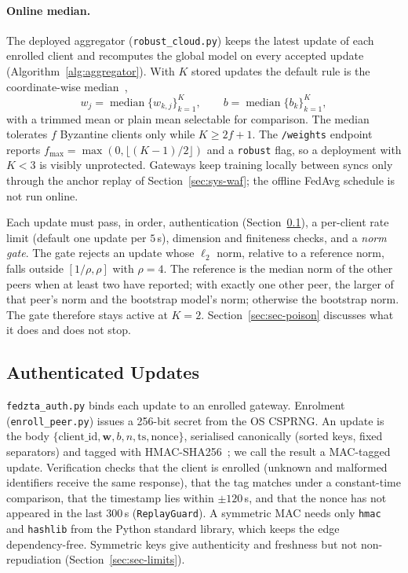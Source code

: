 \paragraph{Online median.}
The deployed aggregator (\texttt{robust\_cloud.py}) keeps the latest update of each enrolled client and recomputes the global model on every accepted update (Algorithm~\ref{alg:aggregator}). With $K$ stored updates the default rule is the coordinate-wise median~\cite{yin2018},
\begin{equation}
w_j = \operatorname{median}\{w_{k,j}\}_{k=1}^{K}, \qquad b = \operatorname{median}\{b_k\}_{k=1}^{K},
\end{equation}
with a trimmed mean or plain mean selectable for comparison. The median tolerates $f$ Byzantine clients only while $K\ge 2f+1$. The \texttt{/weights} endpoint reports $f_{\max}=\max(0,\lfloor (K-1)/2\rfloor)$ and a \texttt{robust} flag, so a deployment with $K<3$ is visibly unprotected. Gateways keep training locally between syncs only through the anchor replay of Section~\ref{sec:sys-waf}; the offline FedAvg schedule is not run online.

Each update must pass, in order, authentication (Section~\ref{sec:sys-auth}), a per-client rate limit (default one update per $5$\,s), dimension and finiteness checks, and a \emph{norm gate}. The gate rejects an update whose $\ell_2$ norm, relative to a reference norm, falls outside $[1/\rho,\rho]$ with $\rho=4$. The reference is the median norm of the other peers when at least two have reported; with exactly one other peer, the larger of that peer's norm and the bootstrap model's norm; otherwise the bootstrap norm. The gate therefore stays active at $K=2$. Section~\ref{sec:sec-poison} discusses what it does and does not stop.

\subsection{Authenticated Updates}
\label{sec:sys-auth}
\texttt{fedzta\_auth.py} binds each update to an enrolled gateway. Enrolment (\texttt{enroll\_peer.py}) issues a 256-bit secret from the OS CSPRNG. An update is the body $\{\text{client\_id},\mathbf{w},b,n,\text{ts},\text{nonce}\}$, serialised canonically (sorted keys, fixed separators) and tagged with HMAC-SHA256~\cite{rfc2104}; we call the result a MAC-tagged update. Verification checks that the client is enrolled (unknown and malformed identifiers receive the same response), that the tag matches under a constant-time comparison, that the timestamp lies within $\pm120$\,s, and that the nonce has not appeared in the last $300$\,s (\texttt{ReplayGuard}). A symmetric MAC needs only \texttt{hmac} and \texttt{hashlib} from the Python standard library, which keeps the edge dependency-free. Symmetric keys give authenticity and freshness but not non-repudiation (Section~\ref{sec:sec-limits}).


